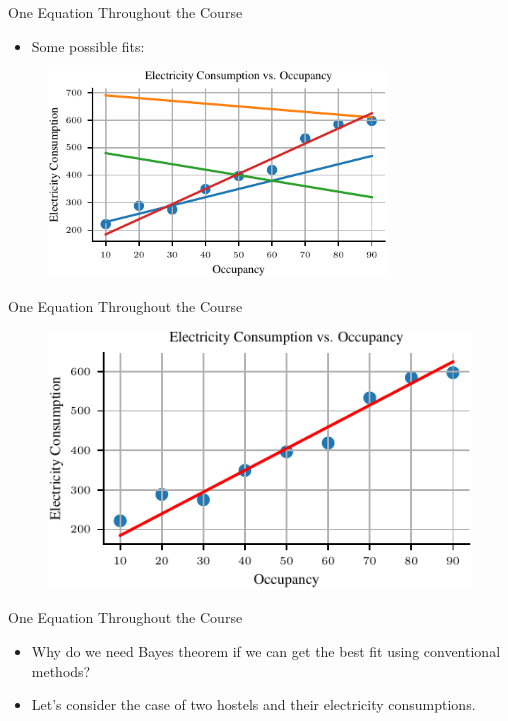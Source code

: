 \documentclass[handout]{beamer}
\begin{document}
    \begin{frame}{One Equation Throughout the Course}
        \begin{itemize}
            \item Some possible fits:
        \end{itemize}
        \begin{figure}
            \centering
            \includegraphics[width=0.8\textwidth]{../figures/introduction-madhav/manyfit.pdf}
        \end{figure}
        
    \end{frame}

    \begin{frame}{One Equation Throughout the Course}
        \begin{figure}
            \includegraphics{../figures/introduction-madhav/bestfit.pdf}
        \end{figure}
        
    \end{frame}

    \begin{frame}{One Equation Throughout the Course}
        \begin{itemize}
            \item Why do we need Bayes theorem if we can get the best fit using conventional methods?
            \item Let's consider the case of two hostels and their electricity consumptions.
        \end{itemize}
        
    \end{frame}
\end{document}
